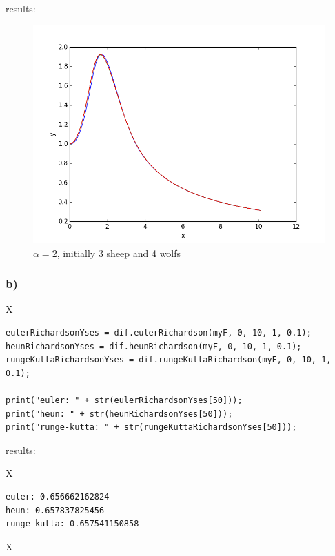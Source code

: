 results:

\begin{figure}[!ht]
\includegraphics[width=1\textwidth]{chapters/images/figure-7-14-a}
\caption{$\alpha = 2$, initially 3 sheep and 4 wolfs}
\end{figure}



\subsubsection{b)}

X

\begin{lstlisting}[caption=todo]
eulerRichardsonYses = dif.eulerRichardson(myF, 0, 10, 1, 0.1);
heunRichardsonYses = dif.heunRichardson(myF, 0, 10, 1, 0.1);
rungeKuttaRichardsonYses = dif.rungeKuttaRichardson(myF, 0, 10, 1, 0.1);

print("euler: " + str(eulerRichardsonYses[50]));
print("heun: " + str(heunRichardsonYses[50]));
print("runge-kutta: " + str(rungeKuttaRichardsonYses[50]));
\end{lstlisting}


results:

X

\begin{lstlisting}[caption=Result of 1.1 a), keywordstyle=\color{black}]
euler: 0.656662162824
heun: 0.657837825456
runge-kutta: 0.657541150858
\end{lstlisting}

X









